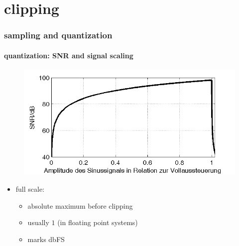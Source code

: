 \section[clipping]{clipping}
	\begin{frame}\frametitle{sampling and quantization}\framesubtitle{quantization: SNR and signal scaling}
	    \begin{figure}
			\centering
				\includegraphics[scale=0.7]{Graph/snr}
		\end{figure}
        
     \begin{itemize}
         \item[] full scale:
            \begin{itemize}
                \item   absolute maximum before clipping
                \item   usually $1$ (in floating point systems)
                \item   marks \unit[0]{dbFS}
            \end{itemize}
     \end{itemize}
	\end{frame}
	

